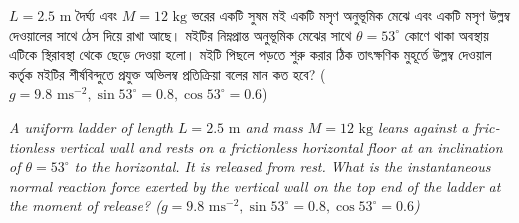 \documentclass[12pt, a4paper]{article}
\begin{document}
\vspace{1em}
\begin{tcolorbox}[questionbox={প্রশ্ন (Question) 36}]
\noindent
$L = 2.5\text{ m}$ দৈর্ঘ্য এবং $M = 12\text{ kg}$ ভরের একটি সুষম মই একটি মসৃণ অনুভূমিক মেঝে এবং একটি মসৃণ উল্লম্ব দেওয়ালের সাথে ঠেস দিয়ে রাখা আছে। মইটির নিম্নপ্রান্ত অনুভূমিক মেঝের সাথে $\theta = 53^\circ$ কোণে থাকা অবস্থায় এটিকে স্থিরাবস্থা থেকে ছেড়ে দেওয়া হলো। মইটি পিছলে পড়তে শুরু করার ঠিক তাৎক্ষণিক মুহূর্তে উল্লম্ব দেওয়াল কর্তৃক মইটির শীর্ষবিন্দুতে প্রযুক্ত অভিলম্ব প্রতিক্রিয়া বলের মান কত হবে? ($g = 9.8\text{ ms}^{-2}, \sin 53^\circ = 0.8, \cos 53^\circ = 0.6$)

\vspace{0.8em}
\begin{english}
\noindent\textit{\color{darkgray}
A uniform ladder of length $L = 2.5\text{ m}$ and mass $M = 12\text{ kg}$ leans against a frictionless vertical wall and rests on a frictionless horizontal floor at an inclination of $\theta = 53^\circ$ to the horizontal. It is released from rest. What is the instantaneous normal reaction force exerted by the vertical wall on the top end of the ladder at the moment of release? ($g = 9.8\text{ ms}^{-2}, \sin 53^\circ = 0.8, \cos 53^\circ = 0.6$)
}
\end{english}
\end{tcolorbox}
\end{document}
